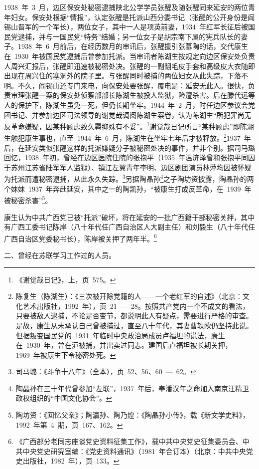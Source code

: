 1938~年~3~月，边区保安处秘密逮捕陕北公学学员张醒及随张醒同来延安的两位青年妇女。保安处根据“情报”，认定张醒是托派山西分委书记（张醒的公开身份是阎锡山晋军的一个军长），两位女子，其中一人是项英前妻，1934~年红军长征后被国民党逮捕，并与一国民党“特务”结婚；另一位女子是胡宗南下属的宪兵队长的妻子。1938~年~6~月前后，在经历数月的审讯后，张醒援引张慕陶的话，交代康生在~1930~年被国民党逮捕后曾参加托派。当审讯者陈湖生按规定向边区保安处负责人周兴汇报后，张醒即迅速被秘密处决。张醒的一副翻毛皮手套和高级皮大衣随即出现在周兴住的塞洞外的院子里。与张醒同时被捕的两位妇女从此失踪，下落不明。不久，阎锡山还专门来电，向保安处要张醒，覆电是：延安无此人。很快，负责审理张醒一案的保安处侦察部部长陈湖生被投人监狱，险遭杀害。后在滕代远等人的保护下，陈湖生虽免一死，但仍长期坐牢。1944~年~2~月，时任边区参议会党团书记、并参加边区司法领导的谢觉哉调阅陈湖生案卷，认为陈湖生“所犯罪尚无反革命嫌疑，因某种顾虑致久羁抑殊有不妥”。\footnote{《谢觉哉日记》，上，页~575。}谢觉哉日记所言“某种顾虑”即陈湖生触犯康生事也，直至~1944~年~6~月，陈湖生在坐牢七年后才被释放。\footnote{陈复生（陈湖生）：《三次被开除党籍的人——一个老红军的自述》（北京：文化艺术出版社，1992~年），页~21~—~28。按照共产党内一个不成文的看法，只要被敌人逮捕，不论是否变节，都说明此人有疑点，需要进行严格的审查。是故，康生从未承认自己曾被捕过，直至八十年代，其妻曹轶欧仍坚持此说。但据叛变国民党的~1931~年临时中央政治局成员卢福坦的说法，康生在~1930~年，曾在沪被捕，并出卖过同志。建国后卢福坦被长期关押，1969~年被康生下令秘密处死。}1937~年后，在延安类似张醒这样的托派嫌疑分子被秘密处决的事件，并非个别。据司马璐回忆，1938~年初，曾经在边区医院住院的张抱平（1935~年温济泽曾和张抱平同囚于苏州江苏省陆军军人监狱）、镇江左翼青年李明、边区剧团演员林萍均因被怀疑为托派而遭秘密逮捕，从此永久失踪。\footnote{司马璐：《斗争十八年》（全本），页~52、56、60~—~62。}另据陶晶孙\footnote{陶晶孙在三十年代曾参加“左联”，1937~年后，奉潘汉年之命加入南京汪精卫政权组织的“中国文化协会”。}之子陶坊资披露，陶晶孙的两个妹妹~1937~年奔赴延安，其中之一的陶凯孙，“被康生打成反革命，在~1939~年被秘密杀害”\footnote{陶坊资：《回忆父亲》；陶瀛孙、陶乃煌：《陶晶孙小传》，载《新文学史料》，1992~年第~4~期，页~167、162。}。

康生认为中共广西党已被“托派”破坏，将在延安的一批广西籍干部秘密关押，其中有广西工委书记陈岸（八十年代任广西自治区人大副主任）和刘毅生（八十年代任广西自治区党委秘书长），陈岸被关押了两年半。\footnote{《广西部分老同志座谈党史资料征集工作》，载中共中央党史征集委员会、中共中央党史研究室编：《党史资料通讯》（1981~年合订本）（北京：中共中央党史出版社，1982~年），页~133。}

二、曾经在苏联学习工作过的人员。

